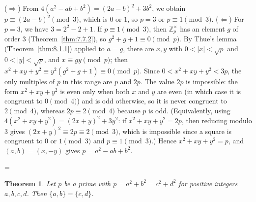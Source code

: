 \documentclass[11pt]{article}
\makeatletter
\theoremstyle{ntstyle}
\newtheorem{theorem}{Theorem}[subsection]
\let\nt@closedisplay\]
\def\nt@guardedclose{\@ifnextchar\par{\nt@closeafterpar}{\@ifnextchar\end{\postdisplaypenalty\@M\nt@closedisplay}{\nt@closedisplay}}}
\def\nt@closeafterpar\par{\@ifnextchar\par{\nt@closeafterpar}{\@ifnextchar\end{\postdisplaypenalty\@M\nt@closedisplay\par}{\nt@closedisplay\par}}}
\renewenvironment{proof}[1][\proofname]{\par
  \pushQED{\qed}\normalfont\topsep\medskipamount\edef\nt@afterproof{\@endparpenalty=\the\@endparpenalty\relax}\@beginparpenalty\@M\@endparpenalty\@M\let\]\nt@guardedclose\trivlist\item[]\textit{#1\@addpunct{.}} \ignorespaces}{\ifvmode\addpenalty\@M\fi\popQED\nt@afterproof\endtrivlist\@endpefalse}
\newcommand{\ZmodUnits}[1]{\mathbb{Z}_{#1}^{\times}}
\makeatother
\begin{document}
\begin{proof} ($\Rightarrow$) From $4(a^2 - ab + b^2) =
		(2a - b)^2 + 3b^2$, we obtain $p \equiv (2a - b)^2 \pmod{3}$, which is $0$ or
	$1$, so $p = 3$ or $p \equiv 1 \pmod{3}$. ($\Leftarrow$) For $p = 3$,
	we have $3 = 2^2 - 2 + 1$. If $p \equiv 1 \pmod{3}$, then
	$\ZmodUnits{p}$ has an element $g$ of order $3$ (Theorem~\ref{thm:7.7.2}), so $g^2 + g + 1 \equiv 0 \pmod{p}$. By Thue's lemma (Theorem~\ref{thm:8.1.1}) applied to
	$a = g$, there are $x, y$ with $0<|x|<\sqrt{p}$ and $0<|y|<\sqrt{p}$, and $x \equiv
		gy \pmod{p}$; then $x^2 + xy + y^2 \equiv y^2(g^2 + g + 1) \equiv 0
		\pmod{p}$. Since $0 < x^2 + xy + y^2 < 3p$, the only multiples of $p$
	in this range are $p$ and $2p$. The value $2p$ is impossible: the
	form $x^2 + xy + y^2$ is even only when both $x$ and $y$ are even (in
	which case it is congruent to $0 \pmod{4}$) and is odd otherwise, so it is
	never congruent to $2 \pmod{4}$, whereas $2p \equiv 2 \pmod{4}$ because $p$
	is odd. (Equivalently, using $4(x^2 + xy + y^2) = (2x + y)^2 + 3y^2$:
	if $x^2 + xy + y^2 = 2p$, then reducing modulo $3$ gives $(2x + y)^2
		\equiv 2p \equiv 2 \pmod{3}$, which is impossible since a square is congruent to $0$
	or $1 \pmod{3}$ and $p \equiv 1 \pmod{3}$.) Hence $x^2 + xy + y^2 = p$,
	and $(a, b) = (x, -y)$ gives $p = a^2 - ab + b^2$.

\end{proof}
\begin{theorem}\label{thm:8.1.7} Let $p$ be a prime with $p = a^2 + b^2 = c^2 + d^2$
	for positive integers $a, b, c, d$. Then $\{a, b\} = \{c, d\}$.

\end{theorem}
\end{document}

